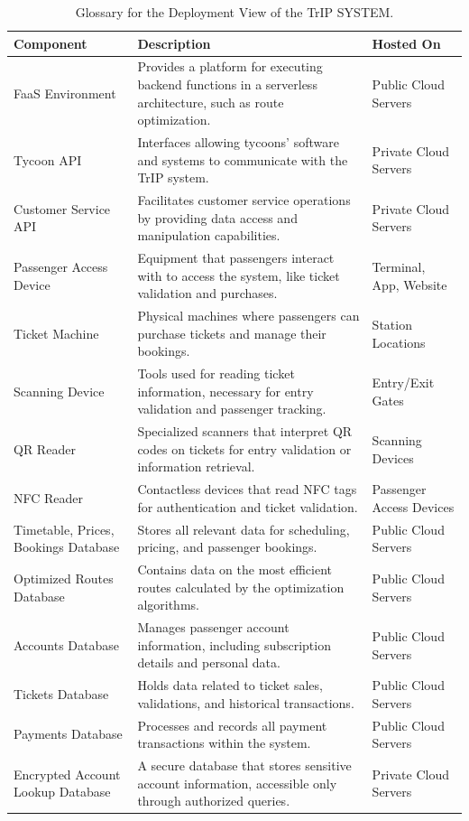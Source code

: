 \begin{table}[H]
    \centering
    \caption{Glossary for the Deployment View of the TrIP SYSTEM.}
    \label{tab:deployment_view_glossary}
    \begin{tabularx}{\textwidth}{@{}lXX@{}} %
    \toprule
    \textbf{Component} & \textbf{Description} & \textbf{Hosted On} \\
    \midrule
    FaaS Environment & Provides a platform for executing backend functions in a serverless architecture, such as route optimization. & Public Cloud Servers \\
    Tycoon API & Interfaces allowing tycoons' software and systems to communicate with the TrIP system. & Private Cloud Servers \\
    Customer Service API & Facilitates customer service operations by providing data access and manipulation capabilities. & Private Cloud Servers \\
    Passenger Access Device & Equipment that passengers interact with to access the system, like ticket validation and purchases. & Terminal, App, Website \\
    Ticket Machine & Physical machines where passengers can purchase tickets and manage their bookings. & Station Locations \\
    Scanning Device & Tools used for reading ticket information, necessary for entry validation and passenger tracking. & Entry/Exit Gates \\
    QR Reader & Specialized scanners that interpret QR codes on tickets for entry validation or information retrieval. & Scanning Devices \\
    NFC Reader & Contactless devices that read NFC tags for authentication and ticket validation. & Passenger Access Devices \\
    Timetable, Prices, Bookings Database & Stores all relevant data for scheduling, pricing, and passenger bookings. & Public Cloud Servers \\
    Optimized Routes Database & Contains data on the most efficient routes calculated by the optimization algorithms. & Public Cloud Servers \\
    Accounts Database & Manages passenger account information, including subscription details and personal data. & Public Cloud Servers \\
    Tickets Database & Holds data related to ticket sales, validations, and historical transactions. & Public Cloud Servers \\
    Payments Database & Processes and records all payment transactions within the system. & Public Cloud Servers \\
    Encrypted Account Lookup Database & A secure database that stores sensitive account information, accessible only through authorized queries. & Private Cloud Servers \\
    \bottomrule
    \end{tabularx}
\end{table}

